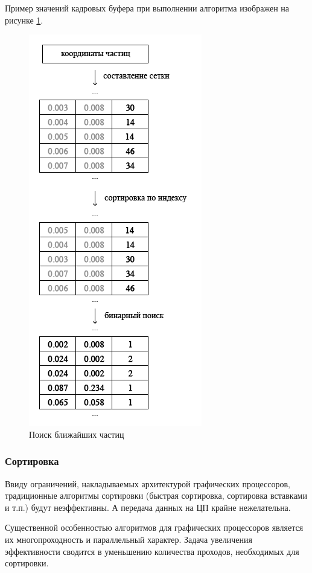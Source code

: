 Пример значений кадровых буфера при выполнении алгоритма изображен на рисунке \ref{fig:nei_search}.

\begin{figure}
\begin{center}
  \includegraphics[scale=1]{Figures/nei_search}
\end{center}
\caption{Поиск ближайших частиц}
\label{fig:nei_search}
\end{figure}


\subsubsection{Сортировка}

Ввиду ограничений, накладываемых архитектурой графических процессоров, традиционные алгоритмы
сортировки (быстрая сортировка, сортировка вставками и т.п.) будут неэффективны. А передача
данных на ЦП крайне нежелательна.

Существенной особенностью алгоритмов для графических процессоров является их многопроходность
и параллельный характер. Задача увеличения эффективности сводится в уменьшению количества
проходов, необходимых для сортировки.

